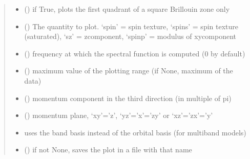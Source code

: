 \documentclass[letterpaper,10pt,english]{sphinxmanual}
\begin{document}
\begin{fulllineitems}
\begin{quote}
\begin{description}
\begin{itemize}
\item {} 
\sphinxAtStartPar
{} () \textendash{} if True, plots the first quadrant of a square Brillouin zone only

\item {} 
\sphinxAtStartPar
{} () \textendash{} The quantity to plot. ‘spin’ = spin texture, ‘spins’ = spin texture (saturated), ‘sz’ = z\sphinxhyphen{}component, ‘spinp’ = modulus of xy\sphinxhyphen{}component

\item {} 
\sphinxAtStartPar
{} () \textendash{} frequency at which the spectral function is computed (0 by default)

\item {} 
\sphinxAtStartPar
{} () \textendash{} maximum value of the plotting range (if None, maximum of the data)

\item {} 
\sphinxAtStartPar
{} () \textendash{} momentum component in the third direction (in multiple of pi)

\item {} 
\sphinxAtStartPar
{} () \textendash{} momentum plane, ‘xy’=’z’, ‘yz’=’x’=’zy’ or ‘xz’=’zx’=’y’

\item {} 
\sphinxAtStartPar
{} \textendash{} uses the band basis instead of the orbital basis (for multiband models)

\item {} 
\sphinxAtStartPar
{} () \textendash{} if not None, saves the plot in a file with that name


\end{itemize}
\end{description}
\end{quote}
\end{fulllineitems}
\end{document}
